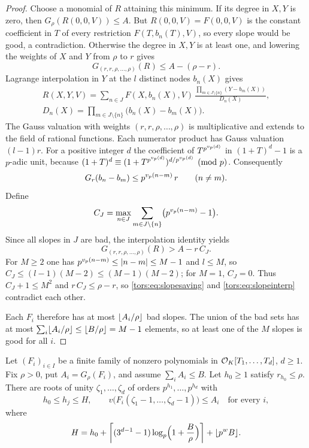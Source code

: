 \begin{proof}
Choose a monomial of $R$ attaining this minimum. If its degree in $X,Y$ is zero, then
$G_\rho(R(0,0,V))\le A$. But $R(0,0,V)=F(0,0,V)$ is the constant coefficient in $T$ of
every restriction $F(T,b_n(T),V)$, so every slope would be good, a contradiction.
Otherwise the degree in $X,Y$ is at least one, and lowering the weights of $X$ and $Y$
from $\rho$ to $r$ gives
\begin{equation}\label{tors:eq:slopesaving}
  G_{(r,r,\rho,\dots,\rho)}(R)\le A-(\rho-r).
\end{equation}
Lagrange interpolation in $Y$ at the $l$ distinct nodes $b_n(X)$ gives
\begin{gather*}
  R(X,Y,V)=\sum_{n\in J}F(X,b_n(X),V)\,
  \frac{\prod_{m\in J\setminus\{n\}}(Y-b_m(X))}{D_n(X)},\\
  D_n(X)=\prod_{m\in J\setminus\{n\}}\bigl(b_n(X)-b_m(X)\bigr).
\end{gather*}
The Gauss valuation with weights $(r,r,\rho,\dots,\rho)$ is multiplicative and extends to
the field of rational functions. Each numerator product has Gauss valuation $(l-1)r$.
For a positive integer $d$ the coefficient of $T^{p^{\vp(d)}}$ in $(1+T)^d-1$ is a
$p$-adic unit, because
$(1+T)^d\equiv(1+T^{p^{\vp(d)}})^{d/p^{\vp(d)}}\pmod p$. Consequently
\[
  G_r(b_n-b_m)\le p^{\vp(n-m)}\,r\qquad(n\ne m).
\]
Define
\[
  C_J=\max_{n\in J}\sum_{m\in J\setminus\{n\}}\bigl(p^{\vp(n-m)}-1\bigr).
\]
Since all slopes in $J$ are bad, the interpolation identity yields
\begin{equation}\label{tors:eq:slopeinterp}
  G_{(r,r,\rho,\dots,\rho)}(R)>A-r\,C_J .
\end{equation}
For $M\ge2$ one has $p^{\vp(n-m)}\le\abs{n-m}\le M-1$ and $l\le M$, so
$C_J\le(l-1)(M-2)\le(M-1)(M-2)$; for $M=1$, $C_J=0$. Thus $C_J+1\le M^2$ and
$r\,C_J\le\rho-r$, so \eqref{tors:eq:slopesaving} and \eqref{tors:eq:slopeinterp}
contradict each other.

Each $F_i$ therefore has at most $\floor{A_i/\rho}$ bad slopes. The union of the bad sets
has at most $\sum_i\floor{A_i/\rho}\le\floor{B/\rho}=M-1$ elements, so at least one of the
$M$ slopes is good for all $i$.
\end{proof}

\begin{theorem}\label{tors:thm:notower}
Let $(F_i)_{i\in I}$ be a finite family of nonzero polynomials in
$\OO_K[T_1,\dots,T_d]$, $d\ge1$. Fix $\rho>0$, put $A_i=G_\rho(F_i)$, and assume
$\sum_iA_i\le B$. Let $h_0\ge1$ satisfy $r_{h_0}\le\rho$. There are roots of unity
$\zeta_1,\dots,\zeta_d$ of orders $p^{h_1},\dots,p^{h_d}$ with
\[
  h_0\le h_j\le H,\qquad v\bigl(F_i(\zeta_1-1,\dots,\zeta_d-1)\bigr)\le A_i
  \quad\text{for every }i,
\]
where
\begin{equation}\label{tors:eq:notower}
  H=h_0+\ceil*{(3^{d-1}-1)\log_p\Bigl(1+\frac B\rho\Bigr)}+\floor{p^wB} .
\end{equation}
\end{theorem}

